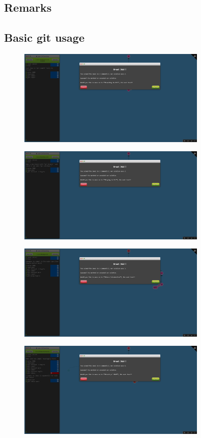 \documentclass[a4paper]{article}
\begin{document}
\subsection{Remarks}
\subsection{Basic git usage}
\begin{figure}[H]
    \centering
    \includegraphics[width=0.8\textwidth]{4.png}
\end{figure}
\begin{figure}[H]
    \centering
    \includegraphics[width=0.8\textwidth]{5.png}
\end{figure}
\begin{figure}[H]
    \centering
    \includegraphics[width=0.8\textwidth]{6.png}
\end{figure}
\begin{figure}[H]
    \centering
    \includegraphics[width=0.8\textwidth]{7.png}
\end{figure}
\end{document}
